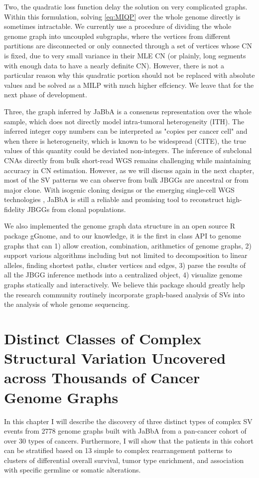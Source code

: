 \documentclass[phd,tocprelim]{cornell}
\begin{document}
Two, the quadratic loss function delay the solution on very complicated graphs. Within this formulation, solving \ref{eq:MIQP} over the whole genome directly is sometimes intractable. We currently use a procedure of dividing the whole genome graph into uncoupled subgraphs, where the vertices from different partitions are disconnected or only connected through a set of vertices whose CN is fixed, due to very small variance in their MLE CN (or plainly, long segments with enough data to have a nearly definite CN). However, there is not a particular reason why this quadratic portion should not be replaced with absolute values and be solved as a MILP with much higher effciency. We leave that for the next phase of development.

Three, the graph inferred by JaBbA is a consensus representation over the whole sample, which does not directly model intra-tumoral heterogeneity (ITH). The inferred integer copy numbers can be interpreted as "copies per cancer cell" and when there is heterogeneity, which is known to be widespread (CITE), the true values of this quantity could be deviated non-integers. The inference of subclonal CNAs directly from bulk short-read WGS remains challenging \cite{McPherson2017-ry} while maintaining accuracy in CN estimation. However, as we will discuss again in the next chapter, most of the SV patterns we can observe from bulk JBGGs are ancestral or from major clone. With isogenic cloning designs \cite{Dewhurst2021-jk} or the emerging single-cell WGS technologies \cite{Zahn2017-re,laks2019,Salehi2021-xi}, JaBbA is still a reliable and promising tool to reconstruct high-fidelity JBGGs from clonal populations.

We also implemented the genome graph data structure in an open source R package gGnome, and to our knowledge, it is the first in class API to genome graphs that can 1) allow creation, combination, arithmetics of genome graphs, 2) support various algorithms including but not limited to decomposition to linear alleles, finding shortest paths, cluster vertices and edges, 3) parse the results of all the JBGG inference methods into a centralized object, 4) visualize genome graphs statically and interactively. We believe this package should greatly help the research community routinely incorporate graph-based analysis of SVs into the analysis of whole genome sequencing.

\chapter{Distinct Classes of Complex Structural Variation Uncovered across Thousands of Cancer Genome Graphs} \label{chap:complex_events}
In this chapter I will describe the discovery of three distinct types of complex SV events from 2778 genome graphs built with JaBbA from a pan-cancer cohort of over 30 types of cancers. Furthermore, I will show that the patients in this cohort can be stratified based on 13 simple to complex rearrangement patterns to clusters of differential overall survival, tumor type enrichment, and association with specific germline or somatic alterations.
\end{document}
